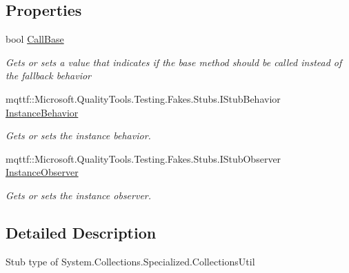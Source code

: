 \subsection*{Properties}
\begin{DoxyCompactItemize}
\item 
bool \hyperlink{class_system_1_1_collections_1_1_specialized_1_1_fakes_1_1_stub_collections_util_a30bd71ea9bf7bd06f637ee84ce551120}{Call\-Base}
\begin{DoxyCompactList}\small\item\em Gets or sets a value that indicates if the base method should be called instead of the fallback behavior\end{DoxyCompactList}\item 
mqttf\-::\-Microsoft.\-Quality\-Tools.\-Testing.\-Fakes.\-Stubs.\-I\-Stub\-Behavior \hyperlink{class_system_1_1_collections_1_1_specialized_1_1_fakes_1_1_stub_collections_util_ac79be48775cee5080d952792e26bc4e8}{Instance\-Behavior}
\begin{DoxyCompactList}\small\item\em Gets or sets the instance behavior.\end{DoxyCompactList}\item 
mqttf\-::\-Microsoft.\-Quality\-Tools.\-Testing.\-Fakes.\-Stubs.\-I\-Stub\-Observer \hyperlink{class_system_1_1_collections_1_1_specialized_1_1_fakes_1_1_stub_collections_util_a8ed6ec12c91ce2a05a084ab2215e4010}{Instance\-Observer}
\begin{DoxyCompactList}\small\item\em Gets or sets the instance observer.\end{DoxyCompactList}\end{DoxyCompactItemize}


\subsection{Detailed Description}
Stub type of System.\-Collections.\-Specialized.\-Collections\-Util



